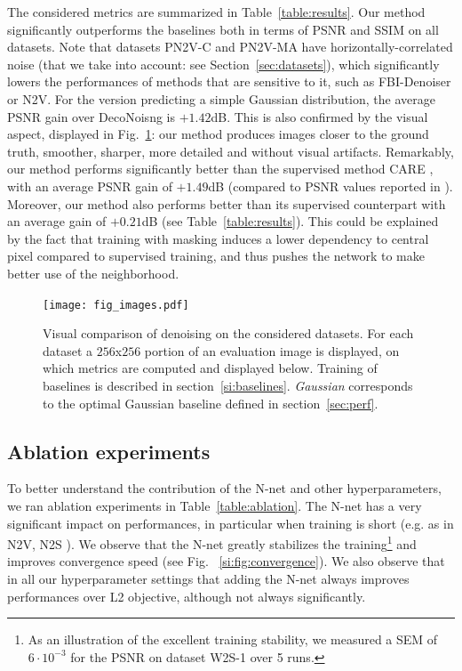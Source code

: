 \documentclass[lettersize,journal]{IEEEtran}
\begin{document}
The considered metrics are summarized in Table~\ref{table:results}.
Our method significantly outperforms the baselines both in terms of PSNR and SSIM on all datasets.
Note that datasets PN2V-C and PN2V-MA have horizontally-correlated noise (that we take into account: see Section~\ref{sec:datasets}), which significantly lowers the performances of methods that are sensitive to it, such as FBI-Denoiser or N2V.
For the version predicting a simple Gaussian distribution, the average PSNR gain over DecoNoisng is $+1.42$dB.
This is also confirmed by the visual aspect, displayed in Fig.~\ref{fig:images}: our method produces images closer to the ground truth, smoother, sharper, more detailed and without visual artifacts.
Remarkably, our method performs significantly better than the supervised method CARE \cite{weigert2017content}, with an average PSNR gain of $+1.49$dB (compared to PSNR values reported in \cite{goncharova2020}).
Moreover, our method also performs better than its supervised counterpart with an average gain of $+0.21$dB (see Table~\ref{table:results}).
This could be explained by the fact that training with masking induces a lower dependency to central pixel compared to supervised training, and thus pushes the network to make better use of the neighborhood.

\begin{figure}[!hbp]
\texttt{[image: fig\_images.pdf]}
\caption{Visual comparison of denoising on the considered datasets. For each dataset a $256$x$256$ portion of an evaluation image is displayed, on which metrics are computed and displayed below. Training of baselines is described in section~\ref{si:baselines}. \textit{Gaussian} corresponds to the optimal Gaussian baseline defined in section~\ref{sec:perf}.}
\label{fig:images}
\end{figure}

\subsection{Ablation experiments}

To better understand the contribution of the N-net and other hyperparameters, we ran ablation experiments in Table~\ref{table:ablation}. The N-net has a very significant impact on performances, in particular when training is short (e.g. as in N2V, N2S \cite{krull2018noise2void, goncharova2020}). We observe that the N-net greatly stabilizes the training\footnote{As an illustration of the excellent training stability, we measured a SEM of $6\cdot10^{-3}$ for the PSNR on dataset W2S-1 over 5 runs.} and improves convergence speed (see Fig. ~\ref{si:fig:convergence}). We also observe that in all our hyperparameter settings that adding the N-net always improves performances over L2 objective, although not always significantly.
\end{document}
